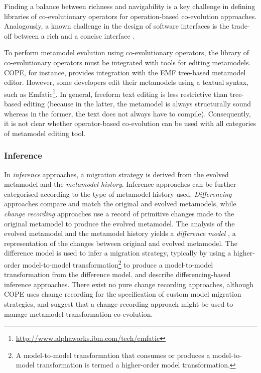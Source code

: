 Finding a balance between richness and navigability is a key challenge in defining libraries of co-evolutionary operators for operation-based co-evolution approaches. Analogously, a known challenge in the design of software interfaces is the trade-off between a rich and a concise interface \cite{bloch05apis}.

To perform metamodel evolution using co-evolutionary operators, the library of co-evolutionary operators must be integrated with tools for editing metamodels. COPE, for instance, provides integration with the EMF tree-based metamodel editor. However, some developers edit their metamodels using a textual syntax, such as Emfatic\footnote{\url{http://www.alphaworks.ibm.com/tech/emfatic}}. In general, freeform text editing is less restrictive than tree-based editing (because in the latter, the metamodel is always structurally sound whereas in the former, the text does not always have to compile). Consequently, it is not clear whether operator-based co-evolution can be used with all categories of metamodel editing tool.

\subsubsection{Inference}
\label{subsec:inference}
\label{subsec:metamodel_matching}
In \emph{inference} approaches, a migration strategy is derived from the evolved metamodel and the \emph{metamodel history}. Inference approaches can be further categorised according to the type of metamodel history used. \emph{Differencing} approaches compare and match the original and evolved metamodels, while \emph{change recording} approaches use a record of primitive changes made to the original metamodel to produce the evolved metamodel. The analysis of the evolved metamodel and the metamodel history yields a \emph{difference model} \cite{cicchetti08automating}, a representation of the changes between original and evolved metamodel. The difference model is used to infer a migration strategy, typically by using a higher-order model-to-model transformation\footnote{A model-to-model transformation that consumes or produces a model-to-model transformation is termed a higher-order model transformation.} to produce a model-to-model transformation from the difference model. \cite{cicchetti08automating} and \cite{garces09managing} describe differencing-based inference approaches. There exist no pure change recording approaches, although COPE \cite{herrmannsdoerfer09cope} uses change recording for the specification of custom model migration strategies, and \cite{mendez10towards} suggest that a change recording approach might be used to manage metamodel-transformation co-evolution.

